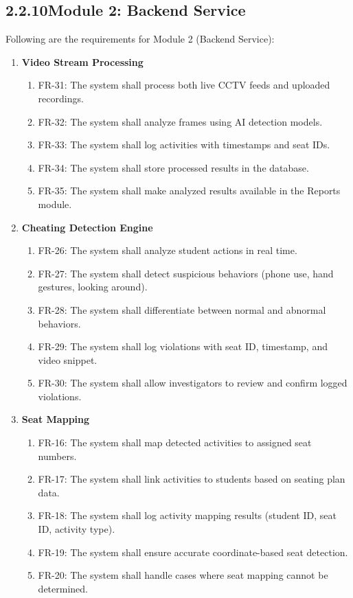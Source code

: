 \subsection*{2.2.10\quad Module 2: Backend Service}
Following are the requirements for Module 2 (Backend Service):

\begin{enumerate}
    \item \textbf{Video Stream Processing}
    \begin{enumerate}[label=(\alph*)]
        \item FR-31: The system shall process both live CCTV feeds and uploaded recordings.
        \item FR-32: The system shall analyze frames using AI detection models.
        \item FR-33: The system shall log activities with timestamps and seat IDs.
        \item FR-34: The system shall store processed results in the database.
        \item FR-35: The system shall make analyzed results available in the Reports module.
    \end{enumerate}

    \item \textbf{Cheating Detection Engine}
    \begin{enumerate}[label=(\alph*)]
        \item FR-26: The system shall analyze student actions in real time.
        \item FR-27: The system shall detect suspicious behaviors (phone use, hand gestures, looking around).
        \item FR-28: The system shall differentiate between normal and abnormal behaviors.
        \item FR-29: The system shall log violations with seat ID, timestamp, and video snippet.
        \item FR-30: The system shall allow investigators to review and confirm logged violations.
    \end{enumerate}

    \item \textbf{Seat Mapping}
    \begin{enumerate}[label=(\alph*)]
        \item FR-16: The system shall map detected activities to assigned seat numbers.
        \item FR-17: The system shall link activities to students based on seating plan data.
        \item FR-18: The system shall log activity mapping results (student ID, seat ID, activity type).
        \item FR-19: The system shall ensure accurate coordinate-based seat detection.
        \item FR-20: The system shall handle cases where seat mapping cannot be determined.
    \end{enumerate}


\end{enumerate}
